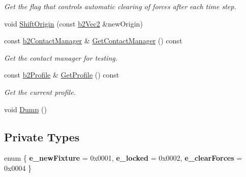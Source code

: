 \begin{DoxyCompactItemize}
\begin{DoxyCompactList}\small\item\em Get the flag that controls automatic clearing of forces after each time step. \end{DoxyCompactList}\item 
void \hyperlink{classb2_world_afc33e20e64252c5be115216051408047}{Shift\+Origin} (const \hyperlink{structb2_vec2}{b2\+Vec2} \&new\+Origin)
\item 
const \hyperlink{classb2_contact_manager}{b2\+Contact\+Manager} \& \hyperlink{classb2_world_a16259159ae1719c30808561c990a8c05}{Get\+Contact\+Manager} () const \hypertarget{classb2_world_a16259159ae1719c30808561c990a8c05}{}\label{classb2_world_a16259159ae1719c30808561c990a8c05}

\begin{DoxyCompactList}\small\item\em Get the contact manager for testing. \end{DoxyCompactList}\item 
const \hyperlink{structb2_profile}{b2\+Profile} \& \hyperlink{classb2_world_af41b3f1a21efc854b485d311911e24b2}{Get\+Profile} () const \hypertarget{classb2_world_af41b3f1a21efc854b485d311911e24b2}{}\label{classb2_world_af41b3f1a21efc854b485d311911e24b2}

\begin{DoxyCompactList}\small\item\em Get the current profile. \end{DoxyCompactList}\item 
void \hyperlink{classb2_world_a73c1fec260d460514edd335d4c235893}{Dump} ()
\end{DoxyCompactItemize}
\subsection*{Private Types}
\begin{DoxyCompactItemize}
\item 
enum \{ {\bfseries e\+\_\+new\+Fixture} = 0x0001, 
{\bfseries e\+\_\+locked} = 0x0002, 
{\bfseries e\+\_\+clear\+Forces} = 0x0004
 \}\hypertarget{classb2_world_a4f7243fc660ab7441065969a882240eb}{}\label{classb2_world_a4f7243fc660ab7441065969a882240eb}

\end{DoxyCompactItemize}
